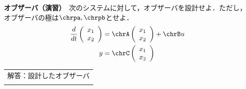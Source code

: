 




\exheader

%





\def\state{
	\left (
	\begin{array}{c}
	 x_1 \\ x_2 
	\end{array}
	\right )
}

\def\cK{
	\left ( \begin{array}{c}
		k_1 \\ k_2 
	\end{array} \right )
}

\def\cKT{
	\left ( \begin{array}{cc}
		k_1 & k_2 
	\end{array} \right )
}

\noindent
{\bf オブザーバ（演習）}　次のシステムに対して，オブザーバを設計せよ．ただし，オブザーバの極は$\chrpa,\chrpb$とせよ．
\begin{align*}
	\frac{d}{dt}
	\state
	& = 
	\chrA \state
	+
	\chrB u
\\
	y&=
	\chrC \state
\end{align*}

\vfill

\begin{tabular}{|l|}
\hline
解答：設計したオブザーバ\\[1.5cm]
\hspace*{15cm}\\
\hline
\end{tabular}

